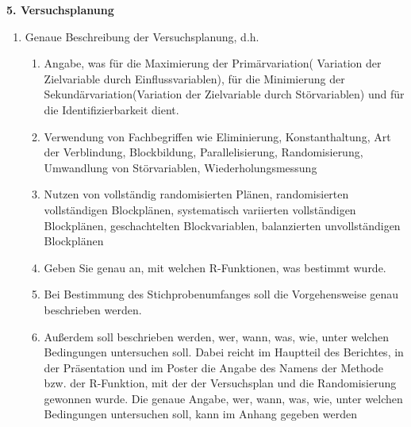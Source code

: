 \documentclass[ ngerman, fontsize= 12pt, paper=a4, headings=big, titlepage=true]{article}
\begin{document}
\textbf{5. Versuchsplanung}
\begin{enumerate}[-]
\item  Genaue Beschreibung der Versuchsplanung, d.h.
\begin{enumerate}[*]
	\item Angabe, was für die Maximierung der Primärvariation( Variation der Zielvariable durch Einflussvariablen), für die Minimierung der
	Sekundärvariation(Variation der Zielvariable durch Störvariablen) und für die Identifizierbarkeit dient.

	
	\item Verwendung von Fachbegriffen wie Eliminierung, Konstanthaltung, Art der Verblindung, Blockbildung, Parallelisierung, Randomisierung, Umwandlung von Störvariablen, Wiederholungsmessung
	\item Nutzen von vollständig randomisierten Plänen, randomisierten vollständigen Blockplänen, systematisch variierten vollständigen Blockplänen, geschachtelten Blockvariablen, balanzierten unvollständigen Blockplänen
	
	\item Geben Sie genau an, mit welchen R-Funktionen, was bestimmt wurde.
	\item Bei Bestimmung des Stichprobenumfanges soll die Vorgehensweise genau beschrieben
	werden. 
	\item Außerdem soll beschrieben werden, wer, wann, was, wie, unter welchen Bedingungen
	untersuchen soll. Dabei reicht im Hauptteil des Berichtes, in der Präsentation und
	im Poster die Angabe des Namens der Methode bzw. der R-Funktion, mit der
	der Versuchsplan und die Randomisierung gewonnen wurde. Die genaue Angabe,
	wer, wann, was, wie, unter welchen Bedingungen untersuchen soll, kann im Anhang
	gegeben werden
	
	

\end{enumerate}
\end{enumerate}
\end{document}
